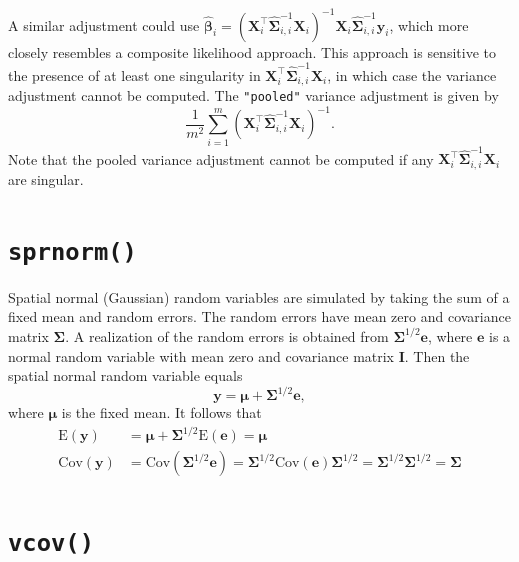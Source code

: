 \documentclass{article}
\begin{document}
A similar adjustment could use
\(\boldsymbol{\hat{\beta}}_i = (\mathbf{X}_i^\top \hat{\boldsymbol{\Sigma}}^{-1}_{i, i} \mathbf{X}_i)^{-1}\mathbf{X}_i \hat{\boldsymbol{\Sigma}}^{-1}_{i, i} \mathbf{y}_i\),
which more closely resembles a composite likelihood approach. This
approach is sensitive to the presence of at least one singularity in
\(\mathbf{X}_i^\top \hat{\boldsymbol{\Sigma}}^{-1}_{i, i} \mathbf{X}_i\),
in which case the variance adjustment cannot be computed. The
\texttt{"pooled"} variance adjustment is given by \begin{equation*}
\frac{1}{m^2} \sum_{i = 1}^m (\mathbf{X}^\top_i \hat{\boldsymbol{\Sigma}}^{-1}_{i, i} \mathbf{X}_i)^{-1}.
\end{equation*} Note that the pooled variance adjustment cannot be
computed if any
\(\mathbf{X}_i^\top \hat{\boldsymbol{\Sigma}}^{-1}_{i, i} \mathbf{X}_i\)
are singular.

\hypertarget{sec:sprnorm}{%
\section{\texorpdfstring{\texttt{sprnorm()}}{sprnorm()}}\label{sec:sprnorm}}

Spatial normal (Gaussian) random variables are simulated by taking the
sum of a fixed mean and random errors. The random errors have mean zero
and covariance matrix \(\boldsymbol{\Sigma}\). A realization of the
random errors is obtained from \(\boldsymbol{\Sigma}^{1/2} \mathbf{e}\),
where \(\mathbf{e}\) is a normal random variable with mean zero and
covariance matrix \(\mathbf{I}\). Then the spatial normal random
variable equals \begin{equation*}
 \mathbf{y} = \boldsymbol{\mu} + \boldsymbol{\Sigma}^{1/2} \mathbf{e},
\end{equation*} where \(\boldsymbol{\mu}\) is the fixed mean. It follows
that \begin{equation*}
  \begin{split}
  \text{E}(\mathbf{y}) & = \boldsymbol{\mu} + \boldsymbol{\Sigma}^{1/2} \text{E}(\mathbf{e}) = \boldsymbol{\mu} \\
  \text{Cov}(\mathbf{y}) & = \text{Cov}(\boldsymbol{\Sigma}^{1/2} \mathbf{e}) = \boldsymbol{\Sigma}^{1/2} \text{Cov}(\mathbf{e}) \boldsymbol{\Sigma}^{1/2} = \boldsymbol{\Sigma}^{1/2} \boldsymbol{\Sigma}^{1/2} = \boldsymbol{\Sigma}
  \end{split}
\end{equation*}

\hypertarget{sec:vcov}{%
\section{\texorpdfstring{\texttt{vcov()}}{vcov()}}\label{sec:vcov}}
\end{document}
